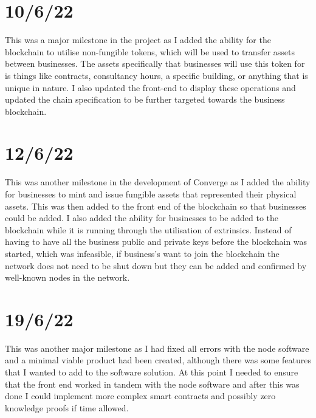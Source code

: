 \section{10/6/22}
This was a major milestone in the project as I added the ability for the blockchain to utilise non-fungible tokens, which will be used to transfer assets between businesses. The assets specifically that businesses will use this token for is things like contracts, consultancy hours, a specific building, or anything that is unique in nature. I also updated the front-end to display these operations and updated the chain specification to be further targeted towards the business blockchain. \\
\section{12/6/22}
This was another milestone in the development of Converge as I added the ability for businesses to mint and issue fungible assets that represented their physical assets. This was then added to the front end of the blockchain so that businesses could be added. I also added the ability for businesses to be added to the blockchain while it is running through the utilisation of extrinsics. Instead of having to have all the business public and private keys before the blockchain was started, which was infeasible, if business’s want to join the blockchain the network does not need to be shut down but they can be added and confirmed by well-known nodes in the network. 
\section{19/6/22}
This was another major milestone as I had fixed all errors with the node software and a minimal viable product had been created, although there was some features that I wanted to add to the software solution. At this point I needed to ensure that the front end worked in tandem with the node software and after this was done I could implement more complex smart contracts and possibly zero knowledge proofs if time allowed.

